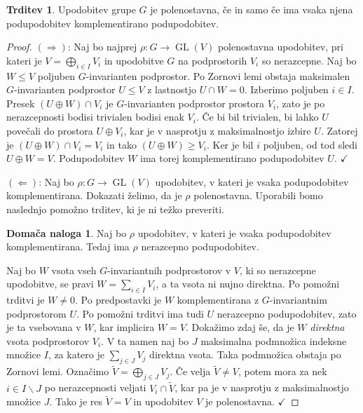 \documentclass[11pt]{book}
\DeclareMathOperator\GL{GL}
\def\kljuka{$\checkmark$}
\theoremstyle{definition}
\theoremstyle{zgled}
\theoremstyle{odprtproblem}
\theoremstyle{domacanaloga}
\newtheorem*{domacanaloga}{Domača naloga}
\newenvironment{dokaz}
    {\color{siva}\begin{proof}}
    {\end{proof}}
\theoremstyle{izrek}
\newtheorem*{trditev}{Trditev}
\begin{document}
\begin{trditev}
Upodobitev grupe $G$ je polenostavna, če in samo če ima vsaka njena podupodobitev komplementirano podupodobitev.
\end{trditev}
\begin{dokaz}
$(\Rightarrow)$: Naj bo najprej $\rho \colon G \to \GL(V)$ polenostavna upodobitev, pri kateri je $V = \bigoplus_{i \in I} V_i$ in upodobitve $G$ na podprostorih $V_i$ so nerazcepne. Naj bo $W \leq V$ poljuben $G$-invarianten podprostor. Po Zornovi lemi obstaja maksimalen $G$-invarianten podprostor $U \leq V$ z lastnostjo $U \cap W = 0$. Izberimo poljuben $i \in I$. Presek $(U \oplus W) \cap V_i$ je $G$-invarianten podprostor prostora $V_i$, zato je po nerazcepnosti bodisi trivialen bodisi enak $V_i$. Če bi bil trivialen, bi lahko $U$ povečali do prostora $U \oplus V_i$, kar je v nasprotju z maksimalnostjo izbire $U$. Zatorej je $(U \oplus W) \cap V_i = V_i$ in tako $(U \oplus W) \geq V_i$. Ker je bil $i$ poljuben, od tod sledi $U \oplus W = V$. Podupodobitev $W$ ima torej komplementirano podupodobitev $U$. \kljuka

$(\Leftarrow)$: Naj bo $\rho \colon G \to \GL(V)$ upodobitev, v kateri je vsaka podupodobitev komplementirana. Dokazati želimo, da je $\rho$ polenostavna. Uporabili bomo naslednjo pomožno trditev, ki je ni težko preveriti.

\begin{domacanaloga}
Naj bo $\rho$ upodobitev, v kateri je vsaka podupodobitev komplementirana. Tedaj ima $\rho$ nerazcepno podupodobitev.
\end{domacanaloga}

Naj bo $W$ vsota vseh $G$-invariantnih podprostorov v $V$, ki so nerazcepne upodobitve, se pravi $W = \sum_{i \in I} V_i$, a ta vsota ni nujno direktna. Po pomožni trditvi je $W \neq 0$. Po predpostavki je $W$ komplementirana z $G$-invariantnim podprostorom $U$. Po pomožni trditvi ima tudi $U$ nerazcepno podupodobitev, zato je ta vsebovana v $W$, kar implicira $W = V$. Dokažimo zdaj še, da je $W$ \emph{direktna} vsota podprostorov $V_i$. V ta namen naj bo $J$ maksimalna podmnožica indeksne množice $I$, za katero je $\sum_{j \in J} V_j$ direktna vsota. Taka podmnožica obstaja po Zornovi lemi. Označimo $\tilde V = \bigoplus_{j \in J} V_j$. Če velja $\tilde V \neq V$, potem mora za nek $i \in I \backslash J$ po nerazcepnosti veljati $V_i \cap \tilde V$, kar pa je v nasprotju z maksimalnostjo množice $J$. Tako je res $\tilde V = V$ in upodobitev $V$ je polenostavna. \kljuka
\end{dokaz}
\end{document}
